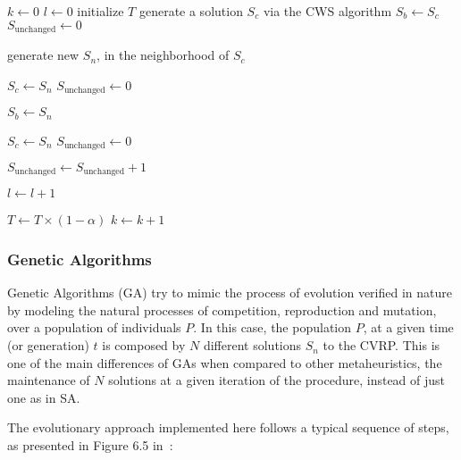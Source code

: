\begin{algorithmic}[1]

\State $k \leftarrow 0$
\State $l \leftarrow 0$
\State initialize $T$
\State generate a solution $S_c$ via the CWS algorithm
\State $S_b \leftarrow S_c$
\State $S_{\text{unchanged}} \leftarrow 0$

\Repeat
\Repeat

\State generate new $S_n$, in the neighborhood of $S_c$


    \State $S_c \leftarrow S_n$
    \State $S_{\text{unchanged}} \leftarrow 0$


        \State $S_b \leftarrow S_n$

    \EndIf

\ElsIf {random[0,1) $< e^{\frac{e(S_c) - e(S_n)}{T}}$}

    \State $S_c \leftarrow S_n$
    \State $S_{\text{unchanged}} \leftarrow 0$

\Else

    \State $S_{\text{unchanged}} \leftarrow S_{\text{unchanged}} + 1$

\EndIf

\State $l \leftarrow l + 1$


\State $T \leftarrow T \times (1 - \alpha)$
\State $k \leftarrow k + 1$


\end{algorithmic}\vertbreak

\subsubsection{Genetic Algorithms}
\label{subsubsec:gen-al}

Genetic Algorithms (GA) try to mimic the process of evolution verified in nature 
by modeling the natural processes of competition, reproduction and mutation, over 
a population of individuals $P$. In this case, the population $P$, at a given 
time (or generation) $t$ is composed by $N$ different solutions $S_n$ to the 
CVRP. This is one of the main differences of GAs when compared to other 
metaheuristics, the maintenance of $N$ solutions at a given iteration of the 
procedure, instead of just one as in SA.\vertbreak

The evolutionary approach implemented here follows a typical sequence of steps, 
as presented in Figure 6.5 in~\cite{Michalewicz2004}:\vertbreak

